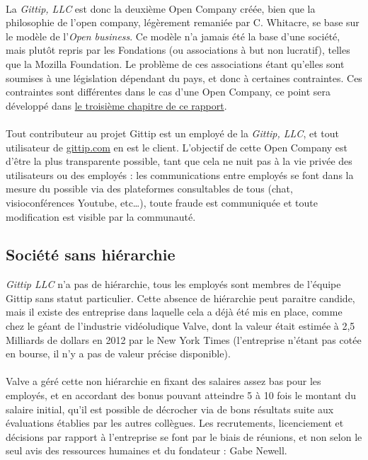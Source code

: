 \paragraph{}
La \emph{Gittip, LLC} est donc la deuxième Open Company créée, bien que la
philosophie de l'open company, légèrement remaniée par C. Whitacre, se base sur
le modèle de l'\emph{Open business}. Ce modèle n'a jamais été la base d'une
société, mais plutôt repris par les Fondations (ou associations à but non
lucratif), telles que la Mozilla Foundation. Le problème de ces associations
étant qu'elles sont soumises à une législation dépendant du pays, et donc à
certaines contraintes. Ces contraintes sont différentes dans le cas d'une Open
Company, ce point sera développé dans \hyperref[chapter3]{le troisième chapitre
de ce rapport}.

\paragraph{}
Tout contributeur au projet Gittip est un employé de la \emph{Gittip, LLC}, et
tout utilisateur de \url{gittip.com} en est le client. L'objectif de cette Open
Company est d'être la plus transparente possible, tant que cela ne nuit pas à
la vie privée des utilisateurs ou des employés : les communications entre
employés se font dans la mesure du possible via des plateformes consultables de
tous (chat, visioconférences Youtube, etc\ldots), toute fraude est communiquée
et toute modification est visible par la communauté.

    \subsection{Société sans hiérarchie}

\emph{Gittip LLC} n'a pas de hiérarchie, tous les employés sont membres de
l'équipe Gittip sans statut particulier. Cette absence de hiérarchie peut
paraitre candide, mais il existe des entreprise dans laquelle cela a déjà été
mis en place, comme chez le géant de l'industrie vidéoludique Valve,
dont la valeur
était estimée à 2,5 Milliards de dollars en 2012 par le New York Times
(l'entreprise n'étant pas cotée en bourse, il n'y a pas de valeur précise
disponible).

\paragraph{}
Valve a géré cette non hiérarchie en fixant des salaires assez bas pour les
employés, et en accordant des bonus pouvant atteindre 5 à 10 fois le montant du
salaire initial, qu'il est possible de décrocher via de bons résultats suite
aux évaluations établies par les autres collègues. Les recrutements,
licenciement et décisions par rapport à l'entreprise se font par le biais de
réunions, et non selon le seul avis des ressources humaines et du fondateur :
Gabe Newell.

